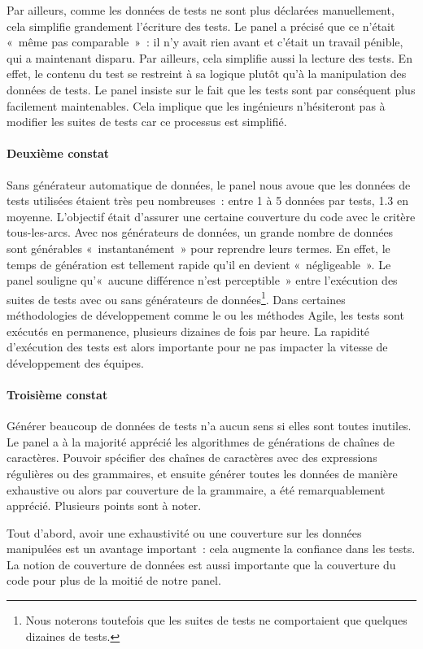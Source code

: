 Par ailleurs, comme les données de tests ne sont plus déclarées manuellement,
cela simplifie grandement l'écriture des tests. Le panel a précisé que ce
n'était «~même pas comparable~»~: il n'y avait rien avant et c'était un travail
pénible, qui a maintenant disparu. Par ailleurs, cela simplifie aussi la lecture
des tests. En effet, le contenu du test se restreint à sa logique plutôt qu'à la
manipulation des données de tests. Le panel insiste sur le fait que les tests
sont par conséquent plus facilement maintenables. Cela implique que les
ingénieurs n'hésiteront pas à modifier les suites de tests car ce processus est
simplifié.

\paragraph{Deuxième constat} Sans générateur automatique de données, le panel
nous avoue que les données de tests utilisées étaient très peu nombreuses~:
entre 1 à 5 données par tests, 1.3 en moyenne. L'objectif était d'assurer une
certaine couverture du code avec le critère tous-les-arcs. Avec nos générateurs
de données, un grande nombre de données sont générables «~instantanément~» pour
reprendre leurs termes. En effet, le temps de génération est tellement rapide
qu'il en devient «~négligeable~». Le panel souligne qu'«~aucune différence n'est
perceptible~» entre l'exécution des suites de tests avec ou sans générateurs de
données\footnote{Nous noterons toutefois que les suites de tests ne comportaient
que quelques dizaines de tests.}. Dans certaines méthodologies de développement
comme le  ou les méthodes Agile, les tests
sont exécutés en permanence, plusieurs dizaines de fois par heure. La rapidité
d'exécution des tests est alors importante pour ne pas impacter la vitesse de
développement des équipes.

\paragraph{Troisième constat} Générer beaucoup de données de tests n'a aucun
sens si elles sont toutes inutiles. Le panel a à la majorité apprécié les
algorithmes de générations de chaînes de caractères. Pouvoir spécifier des
chaînes de caractères avec des expressions régulières ou des grammaires, et
ensuite générer toutes les données de manière exhaustive ou alors par couverture
de la grammaire, a été remarquablement apprécié. Plusieurs points sont à noter.

Tout d'abord, avoir une exhaustivité ou une couverture sur les données
manipulées est un avantage important~: cela augmente la confiance dans les
tests. La notion de couverture de données est aussi importante que la couverture
du code pour plus de la moitié de notre panel.

